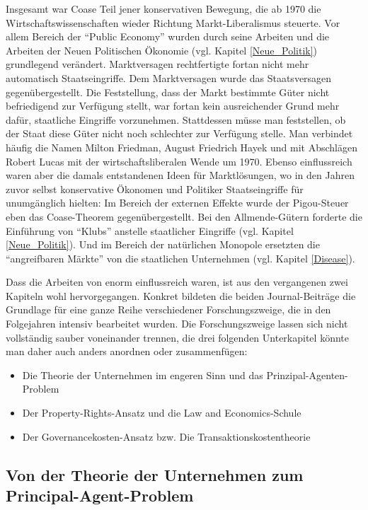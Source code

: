 Insgesamt war Coase Teil jener konservativen Bewegung, die ab 1970 die Wirtschaftswissenschaften wieder Richtung Markt-Liberalismus steuerte. Vor allem  Bereich der "`Public Economy"' wurden durch seine Arbeiten und die Arbeiten der Neuen Politischen Ökonomie (vgl. Kapitel \ref{Neue_Politik}) grundlegend verändert. Marktversagen rechtfertigte fortan nicht mehr automatisch Staatseingriffe. Dem Marktversagen wurde das Staatsversagen gegenübergestellt. Die Feststellung, dass der Markt bestimmte Güter nicht befriedigend zur Verfügung stellt, war fortan kein ausreichender Grund mehr dafür, staatliche Eingriffe vorzunehmen. Stattdessen müsse man feststellen, ob der Staat diese Güter nicht noch schlechter zur Verfügung stelle. Man verbindet häufig die Namen Milton Friedman, August Friedrich Hayek und mit Abschlägen Robert Lucas mit der wirtschaftsliberalen Wende um 1970. Ebenso einflussreich waren aber die damals entstandenen Ideen für Marktlösungen, wo in den Jahren zuvor selbst konservative Ökonomen und Politiker Staatseingriffe für unumgänglich hielten: Im Bereich der externen Effekte wurde der Pigou-Steuer eben das Coase-Theorem gegenübergestellt. Bei den Allmende-Gütern forderte \textcite{Buchanan1965} die Einführung von "`Klubs"' anstelle staatlicher Eingriffe (vgl. Kapitel \ref{Neue_Politik}). Und im Bereich der natürlichen Monopole ersetzten die "`angreifbaren Märkte"' von \textcite{Baumol1982} die staatlichen Unternehmen (vgl. Kapitel \ref{Disease}). 

Dass die Arbeiten von \textcite{Coase1937, Coase1960} enorm einflussreich waren, ist aus den vergangenen zwei Kapiteln wohl hervorgegangen. Konkret bildeten die beiden Journal-Beiträge die Grundlage für eine ganze Reihe verschiedener Forschungszweige, die in den Folgejahren intensiv bearbeitet wurden. Die Forschungszweige lassen sich nicht vollständig sauber voneinander trennen, die drei folgenden Unterkapitel könnte man daher auch anders anordnen oder zusammenfügen:
\begin{itemize}
	\item Die Theorie der Unternehmen im engeren Sinn und das Prinzipal-Agenten-Problem
	\item Der Property-Rights-Ansatz und die Law and Economics-Schule
	\item Der Governancekosten-Ansatz bzw. Die Transaktionskostentheorie
\end{itemize}



\subsection{Von der Theorie der Unternehmen zum Principal-Agent-Problem}
\label{sec: Theorie_Unternehmen}

